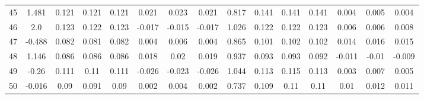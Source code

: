 \begin{table}[H]
{\begin{tabular}{l|c|ccc|ccc|c|ccc|ccc}
			45 & 1.481 & 0.121 & 0.121 & 0.121 & 0.021 & 0.023 & 0.021 & 0.817 & 0.141 & 0.141 & 0.141 & 0.004 & 0.005 & 0.004 \\
			46 & 2.0 & 0.123 & 0.122 & 0.123 & -0.017 & -0.015 & -0.017 & 1.026 & 0.122 & 0.122 & 0.123 & 0.006 & 0.006 & 0.008 \\
			47 & -0.488 & 0.082 & 0.081 & 0.082 & 0.004 & 0.006 & 0.004 & 0.865 & 0.101 & 0.102 & 0.102 & 0.014 & 0.016 & 0.015 \\
			48 & 1.146 & 0.086 & 0.086 & 0.086 & 0.018 & 0.02 & 0.019 & 0.937 & 0.093 & 0.093 & 0.092 & -0.011 & -0.01 & -0.009 \\
			49 & -0.26 & 0.111 & 0.11 & 0.111 & -0.026 & -0.023 & -0.026 & 1.044 & 0.113 & 0.115 & 0.113 & 0.003 & 0.007 & 0.005 \\
			50 & -0.016 & 0.09 & 0.091 & 0.09 & 0.002 & 0.004 & 0.002 & 0.737 & 0.109 & 0.11 & 0.11 & 0.01 & 0.012 & 0.011 \\
	\end{tabular}}
	
\end{table}
\pagebreak
